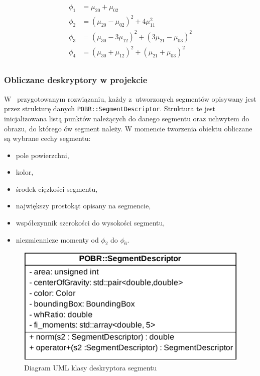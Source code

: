 \begin{equation}
    \begin{aligned}
        \phi_{1} &= \mu_ {20} + \mu_{02} \\
        \phi_{2} &= (\mu_{20} - \mu_{02})^2 + 4\mu^2_{11} \\
        \phi_{3} &= (\mu_{30} - 3\mu_{12})^2 + (3\mu_{21} - \mu_{03})^2 \\
        \phi_{4} &= (\mu_{30} + \mu_{12})^2 + (\mu_{21} + \mu_{03})^2 \\
    \end{aligned}
    \label{eqn:hu-moments}
\end{equation}

\subsubsection{Obliczane deskryptory w projekcie}
W~ przygotowanym rozwiązaniu, każdy z~utworzonych segmentów opisywany jest przez strukturę danych \texttt{POBR::SegmentDescriptor}. Struktura te jest inicjalizowana listą punktów należących do danego segmentu oraz uchwytem do obrazu, do którego ów segment należy. W momencie tworzenia obiektu obliczane są wybrane cechy segmentu:

\begin{itemize}
    \item pole powierzchni,
    \item kolor,
    \item środek cięzkości segmentu,
    \item największy prostokąt opisany na segmencie,
    \item współczynnik szerokości do wysokości segmentu,
    \item niezmiennicze momenty od $\phi_{2}$ do $\phi_{6}$.
\end{itemize}


\begin{figure}[h]
    \centering
    \includegraphics[width=\columnwidth]{figures/POBR-Class.pdf}
    \caption{Diagram UML klasy deskryptora segmentu}
    \label{fig:descriptor-uml}
\end{figure}

